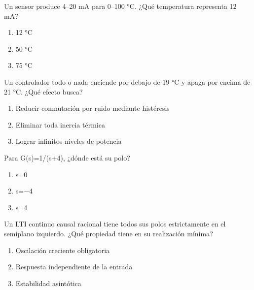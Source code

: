 \noindent\begin{minipage}{\linewidth}\setlength{\parskip}{4pt}\label{q:H-082}
Un sensor produce 4–20 mA para 0–100 °C. ¿Qué temperatura representa 12 mA?
\begin{enumerate}[label=\Alph*),nosep]
\item 12 °C
\item 50 °C
\item 75 °C
\end{enumerate}\end{minipage}\par\medskip

\noindent\begin{minipage}{\linewidth}\setlength{\parskip}{4pt}\label{q:H-083}
Un controlador todo o nada enciende por debajo de 19 °C y apaga por encima de 21 °C. ¿Qué efecto busca?
\begin{enumerate}[label=\Alph*),nosep]
\item Reducir conmutación por ruido mediante histéresis
\item Eliminar toda inercia térmica
\item Lograr infinitos niveles de potencia
\end{enumerate}\end{minipage}\par\medskip

\noindent\begin{minipage}{\linewidth}\setlength{\parskip}{4pt}\label{q:H-084}
Para G(s)=1/(s+4), ¿dónde está su polo?
\begin{enumerate}[label=\Alph*),nosep]
\item s=0
\item s=−4
\item s=4
\end{enumerate}\end{minipage}\par\medskip

\noindent\begin{minipage}{\linewidth}\setlength{\parskip}{4pt}\label{q:H-085}
Un LTI continuo causal racional tiene todos sus polos estrictamente en el semiplano izquierdo. ¿Qué propiedad tiene en su realización mínima?
\begin{enumerate}[label=\Alph*),nosep]
\item Oscilación creciente obligatoria
\item Respuesta independiente de la entrada
\item Estabilidad asintótica
\end{enumerate}\end{minipage}\par\medskip

